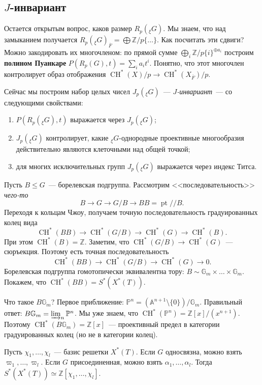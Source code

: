 \documentclass[a4paper]{article}
\DeclareMathOperator{\CH}{CH}
\DeclareMathOperator{\pt}{pt}
\newcommand{\term}{\textbf}
\newcommand{\isom}{\simeq}
\theoremstyle{definition}
\newcommand{\ol}{\overline}
\begin{document}

\subsection{$J$-инвариант}

Остается открытым вопрос, каков размер $R_p({}_{\xi}G)$.
Мы знаем, что над замыканием получается
$R_p({}_{\xi}G)_{\ol{F}} = \bigoplus\mathbb{Z}/p\{\dots\}$.
Как посчитать эти сдвиги?
Можно закодировать их многочленом: по прямой сумме
$\bigoplus_i\mathbb{Z}/p\{i\}^{\oplus a_i}$ построим
\term{полином Пуанкаре} $P(R_p(G),t) = \sum_i a_i t^i$.
Понятно, что этот многочлен контролирует
образ отображения
$\CH^*(X)/p \to \CH^*(X_{\ol{F}})/p$.

Сейчас мы построим набор целых чисел $J_p({}_{\xi}G)$~---
\emph{$J$-инвариант}~--- со следующими свойствами:
\begin{enumerate}
\item $P(R_p({}_{\xi}G),t)$ выражается через $J_p({}_{\xi}G)$;
\item $J_p({}_{\xi}G)$ контролирует, какие ${}_{\xi}G$-однородные
проективные многообразия действительно являются клеточными
над общей точкой;
\item для многих исключительных групп $J_p({}_{\xi}G)$ выражается
через индекс Титса.
\end{enumerate}
Пусть $B\leq G$~--- борелевская подгруппа.
Рассмотрим <<последовательность>> \emph{чего-то}
\[
B \to G \to G/B \to BB = \pt//B.
\]
Переходя к кольцам Чжоу, получаем точную последовательность
градуированных колец вида
\[
\CH^*(BB) \to \CH^*(G/B) \to \CH^*(G) \to \CH^*(B).
\]
При этом $\CH^*(B) = \mathbb{Z}$.
Заметим, что $\CH^*(G/B) \to \CH^*(G)$~--- сюръекция.
Поэтому есть точная последовательность
\[
\CH^*(BB) \to \CH^*(G/B) \to \CH^*(G) \to 0.
\]
Борелевская подгруппа гомотопически эквивалентна тору:
$B \sim \mathbb{G}_m\times \dots \times \mathbb{G}_m$.
Покажем, что $\CH^*(BB) = S^*(X^*(T))$.

Что такое $B\mathbb{G}_m$?
Первое приближение:
$\mathbb{P}^n = (\mathbb{A}^{n+1}\setminus\{0\})/\mathbb{G}_m$.
Правильный ответ: $B\mathbb{G}_m = \varinjlim_n\mathbb{P}^n$.
Мы уже знаем, что $\CH^*(\mathbb{P}^n) = \mathbb{Z}[x] / (x^{n+1})$.
Поэтому $\CH^*(B\mathbb{G}_m) = \mathbb{Z}[x]$~---
проективный предел в категории градуированных колец
(но не в категории колец).

Пусть $\chi_1,\dots,\chi_l$~--- базис решетки $X^*(T)$.
Если $G$ односвязна, можно взять $\varpi_1,\dots,\varpi_l$.
Если $G$ присоединенная, можно взять $\alpha_1,\dots,\alpha_l$.
Тогда $S^*(X^*(T)) \isom \mathbb{Z}[\chi_1,\dots,\chi_l]$.
\end{document}
